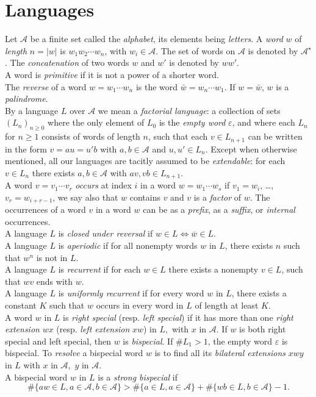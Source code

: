 \documentclass[12pt,a4paper]{amsart}
\begin{document}
 
 \section{Languages}
 Let $\mathcal A$ be a finite set called the {\em  alphabet}, its elements being {\em letters}.
 A {\em word} $w$ of {\em length} $n=|w|$ is $w_1w_2\cdots w_n$, with $w_i \in {\mathcal A}$. The set of words on $\mathcal A$ is denoted by $\mathcal A^{\star}$. The {\em concatenation} of two words $w$ and $w'$ is denoted by $ww'$.\\
 A word is  {\em primitive} if it is not a power of a shorter word.\\
 The {\em reverse} of a word $w=w_1 \cdots w_n$
 is the word $\bar w=w_n\cdots w_1$. If $w=\bar w$, $w$ is a {\it palindrome}.\\
 
By a   language $L$ over $\mathcal A$ we mean  a {\it factorial  language}:
a collection of sets $(L_n)_{n\geq 0}$ where the only element of $L_0$ is the {\em empty word} $\varepsilon$, and where each $L_n$ for $n\geq 1$ consists of words of length $n$,  such that
each $v\in L_{n+1}$ can be written in the form $v=au=u'b$ with $a,b\in \mathcal A$ and $u,u'\in
L_n.$ Except when otherwise mentioned, all our languages are tacitly assumed to be {\it extendable}: for each $v\in L_n$ there exists $a,b\in \mathcal A$ with $av,vb\in L_{n+1}$.\\
A word $v=v_1\cdots v_r$  {\em occurs} at index $i$ in a word $w=w_1\cdots w_s$  if $v_1=w_i$, \ldots ,$v_r=w_{i+r-1}$, we say also that $w$ contains $v$ and $v$ is a {\em factor} of $w$.
The  occurrences of a word $v$ in a word $w$ can be as a {\em prefix}, as a {\em suffix}, or {\em internal} occurrences.\\


A language $L$ is {\em closed under reversal} if $w\in L \Leftrightarrow \bar w \in L$.\\
A language $L$  is {\em aperiodic} if for  all nonempty words $w$ in $L$, there exists $n$ such that  $w^n$ is not in $L$.\\
 A language $L$ is
{\em recurrent} if for each $w\in L$ there exists  a nonempty $v\in L$, such that $wv$ ends with $w$.\\
A language $L$ is {\em uniformly recurrent} if for every word $w$ in $L$, there exists a constant $K$ such that $w$ occurs in every word in $L$ of length at least $K$.\\


 A word $w$ in $L$ is {\em  right special} (resp. {\em  left special}) if it has more than one {\em right extension} $wx$ (resp. {\em left extension} $xw$) in $L,$ with $x$ in $\mathcal A.$  If $w$ is both right special and
left special, then $w$ is {\em  bispecial}. If $\# L_1>1$, the empty word $\varepsilon$
 is bispecial.
 To {\em resolve} a bispecial word $w$ is to find all its  {\em bilateral  extensions}  $xwy$ in $L$ with $x$ in $\mathcal A,$  $y$ in $\mathcal A.$\\
 A bispecial word $w$ in $L$ is a {\em strong  bispecial} if
 $$\#\{aw \in L, a\in \mathcal A, b\in \mathcal A\} > \#\{a \in L, a\in \mathcal A\} +\#\{wb \in L, b\in \mathcal A\} -1.$$
 
\end{document}
